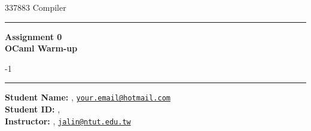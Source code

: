 



\begin{minipage}{.295\textwidth}
    \raggedright
    337883 Compiler\ %
    \footnotesize %
    \medskip\hrule
\end{minipage}
\begin{minipage}{.4\textwidth}
\centering    
\large
\sffamily\bfseries\normalsize
Assignment 0\\
OCaml Warm-up

\end{minipage}
\begin{minipage}{.295\textwidth}
    -1
    \footnotesize
    \medskip\hrule
\end{minipage}


\vspace{1ex}
\begin{framed}
    
\textsf{\textbf{Student Name:}} , \href{mailto:your.email@hotmail.com}{\texttt{your.email@hotmail.com}}\\
\textsf{\textbf{Student ID:}} ,\\
\textsf{\textbf{Instructor:}} , \href{mailto:jalin@ntut.edu.tw}{\texttt{jalin@ntut.edu.tw}}


\end{framed}
\vspace{2ex}








